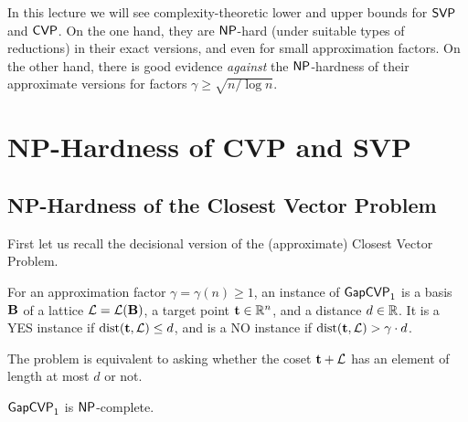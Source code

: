 \documentclass[11pt]{article}
\begin{document}
\thispagestyle{fancy} %


In this lecture we will see complexity-theoretic lower and upper
bounds for $\mathsf{SVP}$ and $\mathsf{CVP}$. On the one hand, they are $\mathsf{NP}$-hard
(under suitable types of reductions) in their exact versions, and even
for small approximation factors. On the other hand, there is good
evidence \emph{against} the $\mathsf{NP}$-hardness of their approximate
versions for factors $\gamma \geq \sqrt{n/\log n}$.

\section{NP-Hardness of CVP and SVP}
\label{sec:np-hardness-cvp-svp}

\subsection{NP-Hardness of the Closest Vector Problem}
\label{sec:np-hardness-cvp}

First let us recall the decisional version of the (approximate)
Closest Vector Problem.

\begin{definition}
  \label{def:gapcvp}
  For an approximation factor $\gamma = \gamma(n) \geq 1$, an instance
  of $\mathsf{GapCVP}_{1}$ is a basis~$\mathbf{B}$ of a lattice
  $\mathcal{L} = \mathcal{L}(\mathbf{B})$, a target point $\mathbf{t} \in \mathbb{R}^n$, and a
  distance $d \in \mathbb{R}$. It is a YES instance if
  $\operatorname{dist}(\mathbf{t}, \mathcal{L}) \leq d$, and is a NO instance if
  $\operatorname{dist}(\mathbf{t}, \mathcal{L}) > \gamma \cdot d$.
\end{definition}
The problem is equivalent to asking whether the coset $\mathbf{t} + \mathcal{L}$
has an element of length at most $d$ or not.

\begin{theorem}
  \label{thm:gapcvp1-np-complete}
  $\mathsf{GapCVP}_{1}$ is $\mathsf{NP}$-complete.
\end{theorem}
\end{document}
